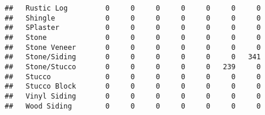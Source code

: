\documentclass[]{article}
\newenvironment{Shaded}{\begin{snugshade}}{\end{snugshade}}
\newcommand{\KeywordTok}[1]{\textcolor[rgb]{0.13,0.29,0.53}{\textbf{#1}}}
\newcommand{\NormalTok}[1]{#1}
\newcommand{\OperatorTok}[1]{\textcolor[rgb]{0.81,0.36,0.00}{\textbf{#1}}}
\begin{document}
\begin{verbatim}
##   Rustic Log         0     0     0     0     0     0     0
##   Shingle            0     0     0     0     0     0     0
##   SPlaster           0     0     0     0     0     0     0
##   Stone              0     0     0     0     0     0     0
##   Stone Veneer       0     0     0     0     0     0     0
##   Stone/Siding       0     0     0     0     0     0   341
##   Stone/Stucco       0     0     0     0     0   239     0
##   Stucco             0     0     0     0     0     0     0
##   Stucco Block       0     0     0     0     0     0     0
##   Vinyl Siding       0     0     0     0     0     0     0
##   Wood Siding        0     0     0     0     0     0     0
\end{verbatim}

\begin{Shaded}
\end{Shaded}
\end{document}
